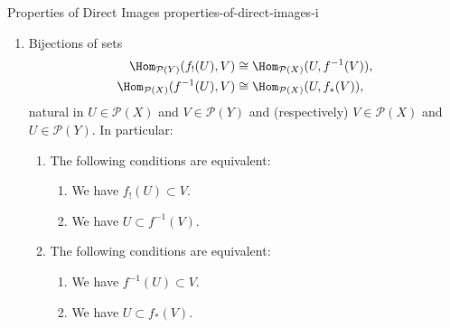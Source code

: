 \begin{proposition}{Properties of Direct Images \rmI}{properties-of-direct-images-i}
\begin{enumerate}
\begin{enumerate}
\begin{itemize}
                        \item For each $U\in\mathcal{P}(X)$, we have $f^{-1}(f_{*}(U))\subset U$.
                        \item For each $V\in\mathcal{P}(Y)$, we have $f_{!}(f^{-1}(V))\subset V$.
                        \item For each $V\in\mathcal{P}(Y)$, we have $V\subset f_{*}(f^{-1}(V))$.
                    \end{itemize}
                \item\label{properties-of-direct-images-i-triple-adjointness-2}Bijections of sets
                    \begin{align*}
                        \Hom_{\mathcal{P}(Y)}(f_{!}(U),V)  &\cong \Hom_{\mathcal{P}(X)}(U,f^{-1}(V)),\\
                        \Hom_{\mathcal{P}(X)}(f^{-1}(U),V) &\cong \Hom_{\mathcal{P}(X)}(U,f_{*}(V)),
                    \end{align*}
                    natural in $U\in\mathcal{P}(X)$ and $V\in\mathcal{P}(Y)$ and (respectively) $V\in\mathcal{P}(X)$ and $U\in\mathcal{P}(Y)$. In particular:
                    \begin{enumerate}
                        \item\label{properties-of-direct-images-i-triple-adjointness-2-a}The following conditions are equivalent:
                            \begin{enumerate}
                                \item\label{properties-of-direct-images-i-triple-adjointness-2-a-i}We have $f_{!}(U)\subset V$.
                                \item\label{properties-of-direct-images-i-triple-adjointness-2-a-ii}We have $U\subset f^{-1}(V)$.
                            \end{enumerate}
                        \item\label{properties-of-direct-images-i-triple-adjointness-2-b}The following conditions are equivalent:
                            \begin{enumerate}
                                \item\label{properties-of-direct-images-i-triple-adjointness-2-b-i}We have $f^{-1}(U)\subset V$.
                                \item\label{properties-of-direct-images-i-triple-adjointness-2-b-ii}We have $U\subset f_{*}(V)$.
                            \end{enumerate}

\end{enumerate}
\end{enumerate}
\end{enumerate}
\end{proposition}
